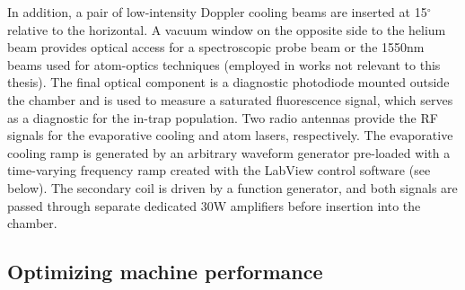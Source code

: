 
	In addition, a pair of low-intensity Doppler cooling beams  are inserted at 15$^\circ$ relative to the horizontal. A vacuum window on the opposite side to the helium beam provides optical access for a spectroscopic probe beam or the 1550nm beams used for atom-optics techniques (employed in works not relevant to this thesis). The final optical component is a diagnostic photodiode mounted outside the chamber and is used to measure a saturated fluorescence signal, which serves as a diagnostic for the in-trap population. Two radio antennas provide the RF signals for the evaporative cooling and atom lasers, respectively. The evaporative cooling ramp is generated by an arbitrary waveform generator pre-loaded with a time-varying frequency ramp created with the LabView control software (see below). The secondary coil is driven by a function generator, and both signals are passed through separate dedicated 30W amplifiers before insertion into the chamber.


\subsection*{Optimizing machine performance}


